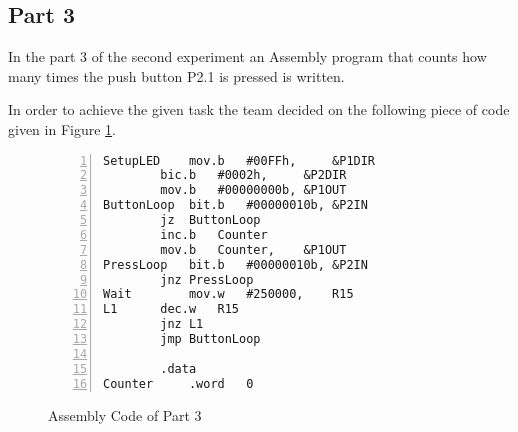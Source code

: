\documentclass[pdftex,12pt,a4paper]{article}
\begin{document}
\newpage
\subsection{Part 3}
In the part 3 of the second experiment an Assembly program that counts how many times the push button P2.1 is pressed is written.



\newline{}
In order to achieve the given task the team decided on the following piece of code given in Figure \ref{code:part3}.

\begin{figure}[H]
    \centering
\begin{lstlisting}[language={[x86masm]Assembler}, numbers=left]
SetupLED	mov.b	#00FFh,		&P1DIR
		bic.b	#0002h,		&P2DIR
		mov.b	#00000000b,	&P1OUT
ButtonLoop	bit.b	#00000010b,	&P2IN
		jz	ButtonLoop
		inc.b	Counter
		mov.b	Counter,	&P1OUT
PressLoop	bit.b	#00000010b,	&P2IN
		jnz	PressLoop
Wait		mov.w	#250000,	R15
L1		dec.w	R15
		jnz	L1
		jmp	ButtonLoop

		.data
Counter		.word	0
\end{lstlisting}
    \caption{Assembly Code of Part 3}
    \label{code:part3}
\end{figure}
\end{document}
